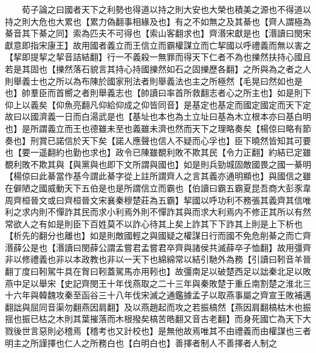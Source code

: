 　　荀子論之曰國者天下之利勢也得道以持之則大安也大榮也積美之源也不得道以持之則大危也大累也【累力偽翻事相緣及也】有之不如無之及其綦也【齊人謂極為綦音其下綦之同】索為匹夫不可得也【索山客翻求也】齊湣宋獻是也【湣讀曰閔宋獻意即指宋康王】故用國者義立而王信立而霸權謀立而亡挈國以呼禮義而無以害之【挈即提挈之挈音詰結翻】行一不義殺一無罪而得天下仁者不為也擽然扶持心國且若是其固也【擽然落石貌言其持心持國擽然如石之固擽歷各翻】之所與為之者之人則舉義士也之所以為布陳於國家刑法者則舉義法也主之所極然【毛晃曰然如也是也】帥羣臣而首嚮之者則舉義志也【帥讀曰率首所救翻志者心之所主也】如是則下仰上以義矣【仰魚亮翻凡仰給仰成之仰皆同音】是基定也基定而國定國定而天下定故曰以國濟義一日而白湯武是也【基址也本也為土立址曰基為木立根本亦曰基白明也】是所謂義立而王也德雖未至也義雖未濟也然而天下之理略奏矣【楊倞曰略有節奏也】刑賞已諾信於天下矣【諾人應聲也信人不疑而心孚也】臣下曉然皆知其可要也【要一遥翻約也勤也求也】政令已陳雖覩利敗不欺其民【令力正翻】約結已定雖覩利敗不欺其與【與黨與也即下文所謂與國也】如是則兵勁城固敵國畏之國一綦明【楊倞曰此綦當作基今謂此綦字從上註所謂齊人之言其義亦通明顯也】與國信之雖在僻陋之國威動天下五伯是也是所謂信立而霸也【伯讀曰霸五霸夏昆吾商大彭豕韋周齊桓晉文或曰齊桓晉文宋襄秦穆楚莊為五霸】挈國以呼功利不務張其義齊其信唯利之求内則不憚詐其民而求小利焉外則不憚詐其與而求大利焉内不修正其所以有然常欲人之有如是則臣下百姓莫不以詐心待其上矣上詐其下下詐其上則是上下析也【析先的翻分也離也】如是則敵國輕之與國疑之權謀日行而國不免危削綦之而亡齊湣薛公是也【湣讀曰閔薛公謂孟嘗君孟嘗君卒齊與諸侯共滅薛卒子恤翻】故用彊齊非以修禮義也非以本政教也非以一天下也綿綿常以結引馳外為務【引讀曰靷音羊晉翻丁度曰靷駕牛具在胷曰靷蓋駕馬亦用靷也】故彊南足以破楚西足以詘秦北足以敗燕中足以舉宋【史記齊閔王十年伐燕取之二十三年與秦敗楚于重丘南割楚之淮北三十六年與韓魏攻秦至函谷三十八年伐宋滅之通鑑據孟子以取燕事屬之齊宣王敗補邁翻詘與屈同音渠勿翻燕因肩翻】及以燕趙起而攻之若振槁然【燕因肩翻槁枯木也振揺也振已枯之木則其葉摧落而木根撥矣槁苦皓翻又音古老翻】而身死國亡為天下大戮後世言惡則必稽焉【稽考也又計校也】是無他故焉唯其不由禮義而由權謀也三者明主之所謹擇也仁人之所務白也【白明白也】善擇者制人不善擇者人制之


